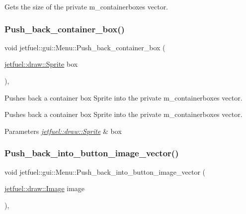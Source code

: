 Gets the size of the private m\+\_\+containerboxes vector. \mbox{\label{classjetfuel_1_1gui_1_1Menu_aa685f56941a8d70eafe30fb325abf38d}} 
\subsubsection{\texorpdfstring{Push\+\_\+back\+\_\+container\+\_\+box()}{Push\_back\_container\_box()}}
{\footnotesize\ttfamily void jetfuel\+::gui\+::\+Menu\+::\+Push\+\_\+back\+\_\+container\+\_\+box (\begin{DoxyParamCaption}\item[{\hyperlink{classjetfuel_1_1draw_1_1Sprite}{jetfuel\+::draw\+::\+Sprite}}]{box }\end{DoxyParamCaption})\hspace{0.3cm}{\ttfamily [inline]}, {\ttfamily [protected]}}



Pushes back a container box Sprite into the private m\+\_\+containerboxes vector. 

Pushes back a container box Sprite into the private m\+\_\+containerboxes vector.


\begin{DoxyParams}{Parameters}
{\em \hyperlink{classjetfuel_1_1draw_1_1Sprite}{jetfuel\+::draw\+::\+Sprite}} & box \\
\hline
\end{DoxyParams}
\mbox{\label{classjetfuel_1_1gui_1_1Menu_a265f704501aa00be0bc2059729896d55}} 
\subsubsection{\texorpdfstring{Push\+\_\+back\+\_\+into\+\_\+button\+\_\+image\+\_\+vector()}{Push\_back\_into\_button\_image\_vector()}}
{\footnotesize\ttfamily void jetfuel\+::gui\+::\+Menu\+::\+Push\+\_\+back\+\_\+into\+\_\+button\+\_\+image\+\_\+vector (\begin{DoxyParamCaption}\item[{\hyperlink{classjetfuel_1_1draw_1_1Image}{jetfuel\+::draw\+::\+Image}}]{image }\end{DoxyParamCaption})\hspace{0.3cm}{\ttfamily [inline]}, {\ttfamily [protected]}}



